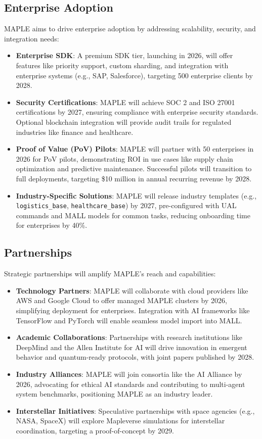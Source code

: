 \documentclass[a4paper,11pt]{article}
\begin{document}
\subsection{Enterprise Adoption}
MAPLE aims to drive enterprise adoption by addressing scalability, security, and integration needs:
\begin{itemize}[leftmargin=*]
    \item \textbf{Enterprise SDK}: A premium SDK tier, launching in 2026, will offer features like priority support, custom sharding, and integration with enterprise systems (e.g., SAP, Salesforce), targeting 500 enterprise clients by 2028.
    \item \textbf{Security Certifications}: MAPLE will achieve SOC 2 and ISO 27001 certifications by 2027, ensuring compliance with enterprise security standards. Optional blockchain integration will provide audit trails for regulated industries like finance and healthcare.
    \item \textbf{Proof of Value (PoV) Pilots}: MAPLE will partner with 50 enterprises in 2026 for PoV pilots, demonstrating ROI in use cases like supply chain optimization and predictive maintenance. Successful pilots will transition to full deployments, targeting \$10 million in annual recurring revenue by 2028.
    \item \textbf{Industry-Specific Solutions}: MAPLE will release industry templates (e.g., \texttt{logistics\_base}, \texttt{healthcare\_base}) by 2027, pre-configured with UAL commands and MALL models for common tasks, reducing onboarding time for enterprises by 40\%.
\end{itemize}

\subsection{Partnerships}
Strategic partnerships will amplify MAPLE’s reach and capabilities:
\begin{itemize}[leftmargin=*]
    \item \textbf{Technology Partners}: MAPLE will collaborate with cloud providers like AWS and Google Cloud to offer managed MAPLE clusters by 2026, simplifying deployment for enterprises. Integration with AI frameworks like TensorFlow and PyTorch will enable seamless model import into MALL.
    \item \textbf{Academic Collaborations}: Partnerships with research institutions like DeepMind and the Allen Institute for AI will drive innovation in emergent behavior and quantum-ready protocols, with joint papers published by 2028.
    \item \textbf{Industry Alliances}: MAPLE will join consortia like the AI Alliance by 2026, advocating for ethical AI standards and contributing to multi-agent system benchmarks, positioning MAPLE as an industry leader.
    \item \textbf{Interstellar Initiatives}: Speculative partnerships with space agencies (e.g., NASA, SpaceX) will explore Mapleverse simulations for interstellar coordination, targeting a proof-of-concept by 2029.
\end{itemize}
\end{document}
